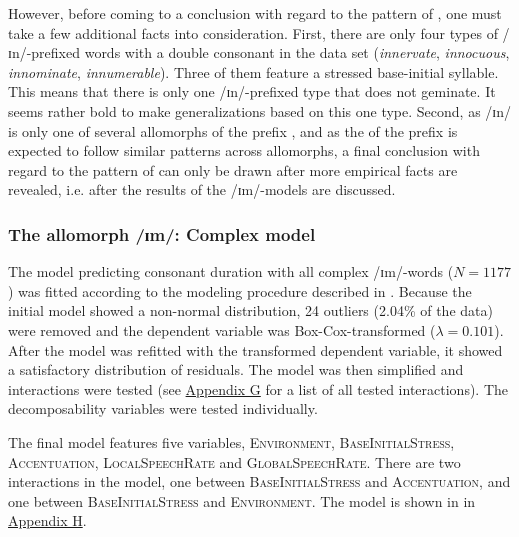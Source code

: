However, before coming to a conclusion with regard to the  pattern of , one must take a few additional facts into consideration. 
First, there are only four types of /ɪn/-prefixed words with a double consonant in the data set (\textit{innervate}, \textit{innocuous}, \textit{innominate}, \textit{innumerable}). Three of them feature a stressed base-initial syllable. This means that there is only one /ɪn/-prefixed type that does not geminate. It seems rather bold to make generalizations based on this one type. 
Second, as /ɪn/ is only one of several allomorphs of the prefix , and as the  of the prefix  is expected to follow similar patterns across allomorphs, 
a final conclusion with regard to the  pattern of  can only be drawn after more empirical facts are revealed, i.e. after the results of the /ɪm/-models are discussed.


\subsubsection{The allomorph /ɪm/: Complex model}\largerpage

The model predicting consonant duration with all complex /ɪm/-words ($N=1177$) was fitted according to the modeling procedure described in .
Because the initial model showed a non-normal distribution,  24 outliers (2.04\% of the data) were removed and the dependent variable was Box-Cox-transformed ($\lambda = 0.101$).  
After the model was refitted with the transformed dependent variable, it showed a satisfactory distribution of residuals. The model was then simplified and interactions were tested (see \hyperref[Appendix G Summaries of tested interactions in experimental study]{Appendix G} for a list of all tested interactions). 
The decomposability variables were tested individually.



The final model features five variables, \textsc{Environment}, \textsc{BaseInitialStress}, \textsc{Accentuation}, \textsc{LocalSpeechRate} and \textsc{GlobalSpeechRate}. There are two interactions in the model, one between \textsc{BaseInitialStress} and \textsc{Accentuation}, and one between \textsc{BaseInitialStress} and \textsc{Environment}. The model is shown in  in \hyperref[Appendix H: Model Summaries Experiment]{Appendix H}.

